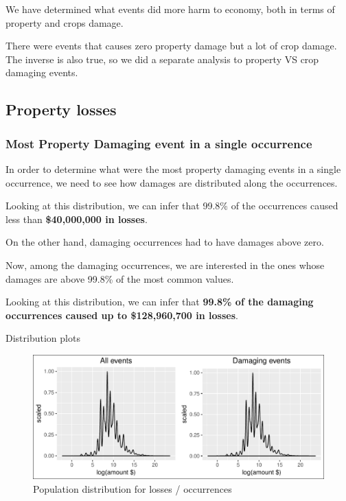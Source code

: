 \documentclass[]{article}
\begin{document}
We have determined what events did more harm to economy, both in terms
of property and crops damage.

There were events that causes zero property damage but a lot of crop
damage. The inverse is also true, so we did a separate analysis to
property VS crop damaging events.

\subsection{Property losses}\label{property-losses}

\subsubsection{Most Property Damaging event in a single
occurrence}\label{most-property-damaging-event-in-a-single-occurrence}

In order to determine what were the most property damaging events in a
single occurrence, we need to see how damages are distributed along the
occurrences.

Looking at this distribution, we can infer that 99.8\% of the
occurrences caused less than \textbf{\$40,000,000 in losses}.

On the other hand, damaging occurrences had to have damages above zero.

Now, among the damaging occurrences, we are interested in the ones whose
damages are above 99.8\% of the most common values.

Looking at this distribution, we can infer that \textbf{99.8\% of the
damaging occurrences caused up to \$128,960,700 in losses}.

Distribution plots

\begin{figure}[htbp]
\centering
\includegraphics{readme_files/figure-latex/crop-distribution-1.pdf}
\caption{Population distribution for losses / occurrences}
\end{figure}
\end{document}
